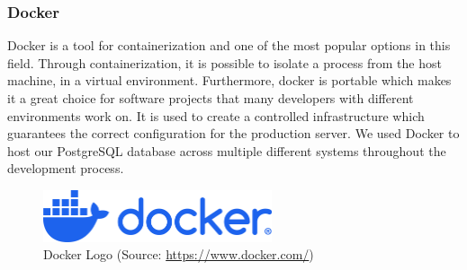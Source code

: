 \Author{\daAuthorTwo}

\subsubsection{Docker}
Docker is a tool for containerization and one of the most popular options in this field. Through containerization, it is possible to isolate a process from the host machine, in a virtual environment. Furthermore, docker is portable which makes it a great choice for software projects that many developers with different environments work on. It is used to create a controlled infrastructure which guarantees the correct configuration for the production server. We used Docker to host our PostgreSQL database across multiple different systems throughout the development process.

\begin{figure} [H]
    \center
    \includegraphics [width=0.6\textwidth] {images/Technologies/dockerLogo.png}
    \caption{Docker Logo (Source: \url{https://www.docker.com/})}
\end{figure}